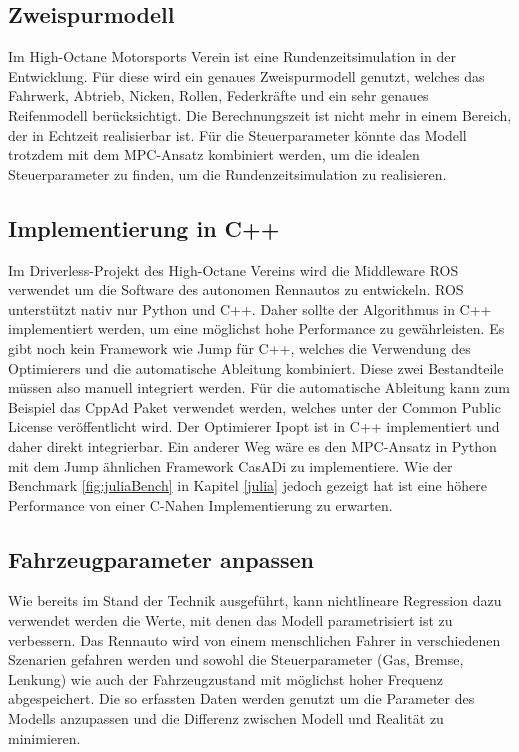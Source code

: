 \documentclass{like}
\begin{document}
\subsection{Zweispurmodell}
Im High-Octane Motorsports Verein ist eine Rundenzeitsimulation in der Entwicklung. Für diese wird ein genaues Zweispurmodell genutzt, welches das Fahrwerk, Abtrieb, Nicken, Rollen, Federkräfte und ein sehr genaues Reifenmodell berücksichtigt. Die Berechnungszeit ist nicht mehr in einem Bereich, der in Echtzeit realisierbar ist. Für die Steuerparameter könnte das Modell trotzdem mit dem \ac{MPC}-Ansatz kombiniert werden, um die idealen Steuerparameter zu finden, um die Rundenzeitsimulation zu realisieren. 

\subsection{Implementierung in C++}
Im Driverless-Projekt des High-Octane Vereins wird die Middleware \ac{ROS} verwendet um die Software des autonomen Rennautos zu entwickeln. \ac{ROS} unterstützt nativ nur Python und C++. Daher sollte der Algorithmus in C++ implementiert werden, um eine möglichst hohe Performance zu gewährleisten. 
Es gibt noch kein Framework wie \ac{Jump} für C++, welches die Verwendung des Optimierers und die automatische Ableitung kombiniert. Diese zwei Bestandteile müssen also manuell integriert werden. Für die automatische Ableitung kann zum Beispiel das CppAd Paket verwendet werden, welches unter der Common Public License veröffentlicht wird. Der Optimierer \ac{Ipopt} ist in C++ implementiert und daher direkt integrierbar. 
Ein anderer Weg wäre es den \ac{MPC}-Ansatz in Python mit dem \ac{Jump} ähnlichen Framework CasADi zu implementiere. Wie der Benchmark \ref{fig:juliaBench} in Kapitel \ref{julia} jedoch gezeigt hat ist eine höhere Performance von einer C-Nahen Implementierung zu erwarten. 

\subsection{Fahrzeugparameter anpassen}
Wie bereits im Stand der Technik ausgeführt, kann nichtlineare Regression dazu verwendet werden die Werte, mit denen das Modell parametrisiert ist zu verbessern. Das Rennauto wird von einem menschlichen Fahrer in verschiedenen Szenarien gefahren werden und sowohl die Steuerparameter (Gas, Bremse, Lenkung) wie auch der Fahrzeugzustand mit möglichst hoher Frequenz abgespeichert. Die so erfassten Daten werden genutzt um die Parameter des Modells anzupassen und die Differenz zwischen Modell und Realität zu minimieren. 


\appendix





%


\listoffigures
\listoftables

%


\end{document}
